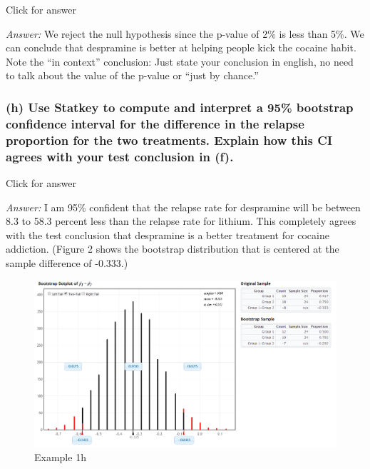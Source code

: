 \documentclass[
]{book}
\begin{document}
Click for answer

\emph{Answer:} We reject the null hypothesis since the p-value of 2\% is less than 5\%. We can conclude that despramine is better at helping people kick the cocaine habit.
Note the ``in context'' conclusion: Just state your conclusion in english, no need to talk about the value of the p-value or ``just by chance.''

\hypertarget{h-use-statkey-to-compute-and-interpret-a-95-bootstrap-confidence-interval-for-the-difference-in-the-relapse-proportion-for-the-two-treatments.-explain-how-this-ci-agrees-with-your-test-conclusion-in-f.}{%
\subsubsection{(h) Use Statkey to compute and interpret a 95\% bootstrap confidence interval for the difference in the relapse proportion for the two treatments. Explain how this CI agrees with your test conclusion in (f).}\label{h-use-statkey-to-compute-and-interpret-a-95-bootstrap-confidence-interval-for-the-difference-in-the-relapse-proportion-for-the-two-treatments.-explain-how-this-ci-agrees-with-your-test-conclusion-in-f.}}

Click for answer

\emph{Answer:} I am 95\% confident that the relapse rate for despramine will be between 8.3 to 58.3 percent less than the relapse rate for lithium. This completely agrees with the test conclusion that despramine is a better treatment for cocaine addiction. (Figure 2 shows the bootstrap distribution that is centered at the sample difference of -0.333.)

\begin{figure}
\centering
\includegraphics{data/DLboot.png}
\caption{Example 1h}
\end{figure}
\end{document}
